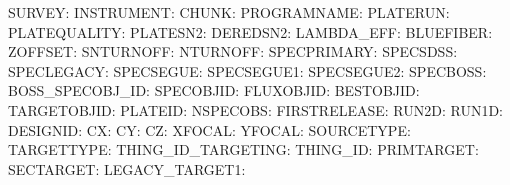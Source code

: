 SURVEY:  \newline 
INSTRUMENT:  \newline 
CHUNK:  \newline 
PROGRAMNAME:  \newline 
PLATERUN:  \newline 
PLATEQUALITY:  \newline 
PLATESN2:  \newline 
DEREDSN2:  \newline 
LAMBDA\_EFF:  \newline 
BLUEFIBER:  \newline 
ZOFFSET:  \newline 
SNTURNOFF:  \newline 
NTURNOFF:  \newline 
SPECPRIMARY:  \newline 
SPECSDSS:  \newline 
SPECLEGACY:  \newline 
SPECSEGUE:  \newline 
SPECSEGUE1:  \newline 
SPECSEGUE2:  \newline 
SPECBOSS:  \newline 
BOSS\_SPECOBJ\_ID:  \newline 
SPECOBJID:  \newline 
FLUXOBJID:  \newline 
BESTOBJID:  \newline 
TARGETOBJID:  \newline 
PLATEID:  \newline 
NSPECOBS:  \newline 
FIRSTRELEASE:  \newline 
RUN2D:  \newline 
RUN1D:  \newline 
DESIGNID:  \newline 
CX:  \newline 
CY:  \newline 
CZ:  \newline 
XFOCAL:  \newline 
YFOCAL:  \newline 
SOURCETYPE:  \newline 
TARGETTYPE:  \newline 
THING\_ID\_TARGETING:  \newline 
THING\_ID:  \newline 
PRIMTARGET:  \newline 
SECTARGET:  \newline 
LEGACY\_TARGET1:  \newline 
